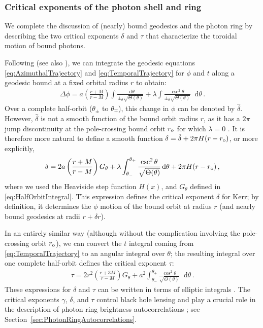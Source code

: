 \documentclass[graybox,envcountchap]{svmult}
\newcommand{\ed}{\mathop{}\!\mathrm{d}}
\newcommand{\pa}[1]{\left(#1\right)}
\begin{document}
\subsubsection*{Critical exponents of the photon shell and ring}

We complete the discussion of (nearly) bound geodesics and the photon ring by describing the two critical exponents $\delta$ and $\tau$ that characterize the toroidal motion of bound photons.

Following \cite{GrallaLupsasca2020a} (see also \cite{Teo2003}), we can integrate the geodesic equations \eqref{eq:AzimuthalTrajectory} and \eqref{eq:TemporalTrajectory} for $\phi$ and $t$ along a geodesic bound at a fixed orbital radius $r$ to obtain:
\begin{align}
    \Delta\phi=a\pa{\frac{r+M}{r-M}}\int\frac{\ed\theta}{\pm_\theta\sqrt{\Theta(\theta)}}+\lambda\int\frac{\csc^2{\theta}}{\pm_\theta\sqrt{\Theta(\theta)}}\ed\theta\,.
\end{align}
Over a complete half-orbit ($\theta_\pm$ to $\theta_\mp$), this change in $\phi$ can be denoted by $\hat{\delta}$.
However, $\hat{\delta}$ is not a smooth function of the bound orbit radius $r$, as it has a $2\pi$ jump discontinuity at the pole-crossing bound orbit $r_{\rm o}$ for which $\lambda=0$ \cite{Teo2003,GrallaLupsasca2020a}.
It is therefore more natural to define a smooth function $\delta=\hat{\delta}+2\pi H(r-r_{\rm o})$, or more explicitly,
\begin{align}
    \delta=2a\pa{\frac{r+M}{r-M}}G_\theta+\lambda\int_{\theta_-}^{\theta_+}\frac{\csc^2{\theta}}{\sqrt{\Theta(\theta)}}\ed\theta+2\pi H(r-r_{\rm o})\,,
\end{align}
where we used the Heaviside step function $H(x)$, and $G_\theta$ defined in \eqref{eq:HalfOrbitIntegral}.
This expression defines the critical exponent $\delta$ for Kerr; by definition, it determines the $\phi$ motion of the bound orbit at radius $r$ (and nearly bound geodesics at radii $r+\delta r$).

In an entirely similar way (although without the complication involving the pole-crossing orbit $r_{\rm o}$), we can convert the $t$ integral coming from \eqref{eq:TemporalTrajectory} to an angular integral over $\theta$; the resulting integral over one complete half-orbit defines the critical exponent $\tau$:
\begin{align}
    \tau=2r^2\pa{\frac{r+3M}{r-M}}G_\theta+a^2\int_{\theta_-}^{\theta_+}\frac{\cos^2{\theta}}{\sqrt{\Theta(\theta)}}\ed\theta\,.
\end{align}
These expressions for $\delta$ and $\tau$ can be written in terms of elliptic integrals \cite{GrallaLupsasca2020a}.
The critical exponents $\gamma$, $\delta$, and $\tau$ control black hole lensing \cite{GrallaLupsasca2020a} and play a crucial role in the description of photon ring brightness autocorrelations \cite{Hadar2021}; see Section~\ref{sec:PhotonRingAutocorrelations}.
\end{document}
